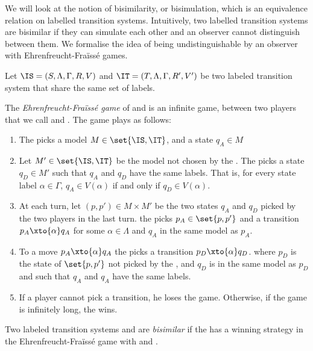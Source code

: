 We will look at the notion of bisimilarity, or bisimulation, which is
an equivalence relation on labelled transition systems.
Intuitively, two labelled transition systems are bisimilar if
they can simulate each other and an observer cannot distinguish
between them.
We formalise the idea of being undistinguishable
by an observer with Ehrenfreucht-Fraïssé games.

\begin{definition}
    Let $\IS = (S, \Lambda, \Gamma, R, V)$
    and $\IT = (T, \Lambda, \Gamma, R', V')$
    be two labeled transition system that share the same set of labels.

    The \emph{Ehrenfreucht-Fraïssé game} of \IS and \IT is
    an infinite game, between two players that we
    call \Attacker and \Defender.
    The game plays as follows:
    \begin{enumerate}
        \item The \Attacker picks a model $M \in \set{\IS, \IT}$,
            and a state $q_A \in M$
        \item Let $M' \in \set{\IS, \IT}$ be the model not chosen by the \Attacker.
            The \Defender picks a state $q_D \in M'$
            such that $q_A$ and $q_D$ have the same labels.
            That is, for every state label $\alpha \in \Gamma$,
            $q_A \in V(\alpha)$ if and only if $q_D \in V(\alpha)$.

        \item At each turn, let $(p, p') \in M \times M'$ be the two states $q_A$ and $q_D$ picked by the two players
            in the last turn.
            the \Attacker picks $p_A \in \set{p, p'}$
            and a transition $p_A \xto{\alpha} q_A$
            for some $\alpha \in \Lambda$ and $q_A$ in the same model as $p_A$.
        \item To a move $p_A \xto{\alpha} q_A$
            the \Defender picks a transition $p_D \xto{\alpha} q_D$.
            where $p_D$ is the state of $\set{p, p'}$ not picked by the \Attacker,
            and $q_D$ is in the same model as $p_D$
            and such that $q_A$ and $q_A$ have the same labels.
        \item If a player cannot pick a transition,
            he loses the game. Otherwise, if the game is infinitely long,
            the \Defender wins.
    \end{enumerate}
\end{definition}

\begin{definition}
    Two labeled transition systems \IS and \IT are \emph{bisimilar} if
    the \Defender has a winning strategy in the Ehrenfreucht-Fraïssé game
    with \IS and \IT.
\end{definition}


